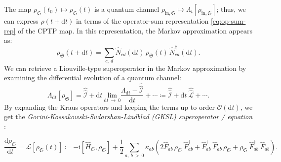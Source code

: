 \documentclass[preprints,article,accept,moreauthors,pdftex]{Definitions/mdpi}
\begin{document}
\begin{paracol}{2}
The map $\rho_{\mathfrak{S}}\left(t_{0}\right) \mapsto \rho_{\mathfrak{S}}\left(t\right)$ is a quantum channel $\rho_{\mathrm{in},\mathfrak{S}} \mapsto \Lambda_{t}\left[\rho_{\mathrm{in},\mathfrak{S}}\right]$; thus, we can express $\rho\left(t+\mathrm{d}t\right)$ in terms of the operator-sum representation \eqref{eq:op-sum-rep} of the CPTP map. In this representation, the Markov approximation appears as:
\begin{equation}
    \label{eq:Markov-dynamics-Kraus-rep-Schr}
    \rho_{\mathfrak{S}}\left(t+\mathrm{d}t\right) = \sum_{c,\:d}\widehat{N}_{cd}\left(\mathrm{d}t\right)\,\rho_{\mathfrak{S}}\left(t\right)\,\widehat{N}_{cd}^{\dagger}\left(\mathrm{d}t\right).
\end{equation}
We can retrieve a Liouville-type superoperator in the Markov approximation by examining the differential evolution of a quantum channel:
\begin{equation}
    \label{eq:GKSL-difference-quotient-def}
    \Lambda_{\mathrm{d}t}\left[\rho_{\mathfrak{S}}\right] = \hat{\hat{\mathcal{I}}} + \mathrm{d}t\:\underset{\mathrm{d}t\:\rightarrow\:0}{\mathrm{lim}}\frac{\Lambda_{\mathrm{d}t}-\hat{\hat{\mathcal{I}}}}{\mathrm{d}t} + \cdots \coloneqq \hat{\hat{\mathcal{I}}} + \mathrm{d}t\:\hat{\hat{\mathcal{L}}} + \cdots.
\end{equation}
By expanding the Kraus operators and keeping the terms up to order $\mathcal{O}\left(\mathrm{d}t\right)$, we get the \emph{Gorini-Kossakowski-Sudarshan-Lindblad (GKSL) superoperator / equation} \cite{Lindblad76,GKS76}:
\end{paracol}
\begin{equation}
    \label{eq:GKSL-def}
    \frac{\mathrm{d}\rho_{\mathfrak{S}}}{\mathrm{d}t} = \hat{\hat{\mathcal{L}}}\left[\rho_{\mathfrak{S}}\left(t\right)\right] \coloneqq -\mathrm{i}\left[\widehat{H}_{\mathfrak{S}},\rho_{\mathfrak{S}}\right] + \frac{1}{2}\sum_{a,\:b\:>\:0}\kappa_{ab}\left(2\widehat{F}_{ab}\,\rho_{\mathfrak{S}}\:\!\widehat{F}_{ab}^{\dagger} + \widehat{F}_{ab}^{\dagger}\:\!\widehat{F}_{ab}\,\rho_{\mathfrak{S}} + \rho_{\mathfrak{S}}\:\!\widehat{F}_{ab}^{\dagger}\:\!\widehat{F}_{ab}\right).
\end{equation}
\end{document}
